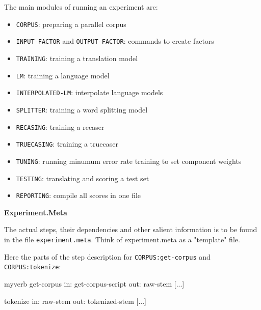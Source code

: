 The main modules of running an experiment are:

\begin{itemize}
\item {\tt CORPUS}: preparing a parallel corpus

\item {\tt INPUT-FACTOR} and {\tt OUTPUT-FACTOR}: commands to create factors

\item {\tt TRAINING}: training a translation model

\item {\tt LM}: training a language model

\item {\tt INTERPOLATED-LM}: interpolate language models

\item {\tt SPLITTER}: training a word splitting model

\item {\tt RECASING}: training a recaser

\item {\tt TRUECASING}: training a truecaser

\item {\tt TUNING}: running minumum error rate training to set component weights

\item {\tt TESTING}: translating and scoring a test set

\item {\tt REPORTING}: compile all scores in one file

\end{itemize}

\vspace{2mm}

{\bf 
\label{experiment-perl.texntoc17}Experiment.Meta}


The actual steps, their dependencies and other salient information is to be found in the file {\tt experiment.meta}. Think of experiment.meta as a "template" file.



Here the parts of the step description for {\tt CORPUS:get-corpus} and {\tt CORPUS:tokenize}:






\begin{SaveVerbatim}{myverb}
 get-corpus
        in: get-corpus-script
        out: raw-stem
        [...]

 tokenize
        in: raw-stem
        out: tokenized-stem
        [...]
\end{SaveVerbatim}
\colorbox{gray}{%
}

